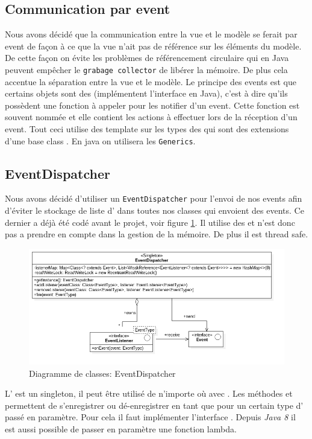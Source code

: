 \documentclass[report, backcover, french, nodocumentinfo]{upmethodology-document}
\begin{document}
			\subsection{Communication par event}
					Nous avons décidé que la communication entre la vue et le modèle se ferait par event de façon à ce que la vue n'ait pas de référence sur les éléments du modèle. De cette façon on évite les problèmes de référencement circulaire qui en Java peuvent empêcher le \texttt{grabage collector} de libérer la mémoire. De plus cela accentue la séparation entre la vue et le modèle.
					Le principe des events est que certains objets sont des  (implémentent l'interface en Java), c'est à dire qu'ils possèdent une fonction à appeler pour les notifier d'un event. Cette fonction est souvent nommée  et elle contient les actions à effectuer lors de la réception d'un event. Tout ceci utilise des template sur les types des  qui sont des extensions d'une base class . En java on utilisera les \texttt{Generics}.
			\subsection{EventDispatcher}
				\p{}
					Nous avons décidé d'utiliser un \texttt{EventDispatcher} pour l'envoi de nos events afin d'éviter le stockage de liste d' dans toutes nos classes qui envoient des events. Ce dernier a déjà été codé avant le projet, voir figure \ref{fig:EventDispatcherClassDiagram}. Il utilise des  et n'est donc pas a prendre en compte dans la gestion de la mémoire. De plus il est thread safe.
					\begin{figure}[h!]
						\centering
						\includegraphics[width=\textwidth]{figures/EventDispatcherClassDiagram}
						\caption{Diagramme de classes: EventDispatcher}
						\label{fig:EventDispatcherClassDiagram}
					\end{figure}
					L' est un singleton, il peut être utilisé de n'importe où avec . Les méthodes  et  permettent de s'enregistrer ou dé-enregistrer en tant que  pour un certain type d' passé en paramètre. Pour cela il faut implémenter l'interface . Depuis \textit{Java 8} il est aussi possible de passer en paramètre une fonction lambda.
\end{document}
